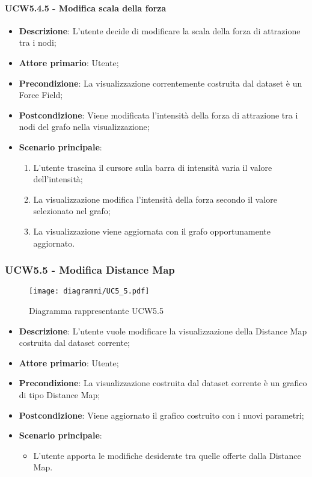 \paragraph{UCW5.4.5 - Modifica scala della forza}
\label{par:ucw5.4.5}
\begin{itemize}
    \item \textbf{Descrizione}: L’utente decide di modificare la scala della forza di attrazione tra i nodi;


    \item \textbf{Attore primario}: Utente;

    \item \textbf{Precondizione}:   La visualizzazione correntemente costruita dal dataset è un Force Field;
    \item \textbf{Postcondizione}:  Viene modificata l'intensità della forza di attrazione tra i nodi del grafo nella visualizzazione;

    \item \textbf{Scenario principale}:
          \begin{enumerate}
              \item L'utente trascina il cursore sulla barra di intensità varia il valore dell’intensità;
              \item La visualizzazione modifica l'intensità della forza secondo il valore selezionato nel grafo;
              \item La visualizzazione viene aggiornata con il grafo opportunamente aggiornato.
          \end{enumerate}
\end{itemize}

\newpage
\subsubsection{UCW5.5 - Modifica Distance Map}
\label{ssub:ucw5.5}
\begin{figure}[h]
    \centering
    \texttt{[image: diagrammi/UC5\_5.pdf]}
    \caption{Diagramma rappresentante UCW5.5}
    \label{fig:UCW5.5}
\end{figure}

\begin{itemize}
    \item \textbf{Descrizione}: L'utente vuole modificare la visualizzazione della Distance Map costruita dal dataset corrente;
    \item \textbf{Attore primario}: Utente;
    \item \textbf{Precondizione}: La visualizzazione costruita dal dataset corrente è un grafico di tipo Distance Map;
    \item \textbf{Postcondizione}: Viene aggiornato il grafico costruito con i nuovi parametri;
    \item \textbf{Scenario principale}:
          \begin{itemize}
              \item L'utente apporta le modifiche desiderate tra quelle offerte dalla Distance Map.
          \end{itemize}
\end{itemize}


